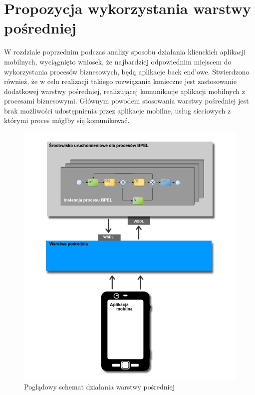 \chapter{Propozycja wykorzystania warstwy pośredniej}
\label{cha:middleware}

W rozdziale poprzednim  podczas analizy sposobu działania klienckich aplikacji mobilnych, wyciągnięto wniosek, że najbardziej odpowiednim miejscem do wykorzystania procesów biznesowych, będą aplikacje back end'owe. Stwierdzono również, że w celu realizacji takiego rozwiązania konieczne jest zastosowanie dodatkowej warstwy pośredniej, realizującej komunikacje aplikacji mobilnych z procesami biznesowymi. Głównym powodem stosowania warstwy pośredniej jest brak możliwości udostępnienia przez aplikacje mobilne, usług sieciowych z którymi proces mógłby się komunikować. 

\begin{figure}[h]
\centerline{\includegraphics[scale=0.5]{middlewareConceptDiagram}}
\caption{Poglądowy schemat działania warstwy pośredniej}
\label{fig:middlewareConceptDiagram}
\end{figure}

